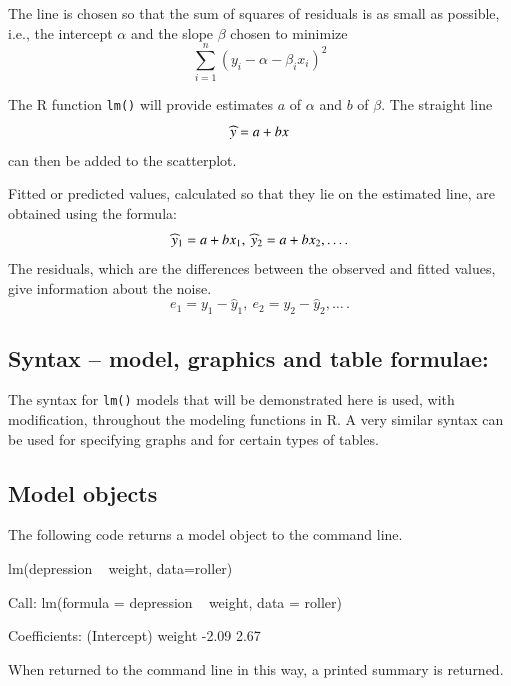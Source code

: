 The line is chosen so that the sum of squares of residuals is as small
as possible, i.e., the intercept
$\alpha$ and the slope $\beta$ chosen to minimize
\[ \sum_{i=1}^n (y_i - \alpha - \beta_i x_i)^2 \]

The R function \verb!lm()! will provide estimates $a$ of
$\alpha$ and $b$ of $\beta$. The straight line \vspace*{-2pt}
\[ \widehat{y} = a + b x
\vspace*{-2pt}
\]
can then be added to the scatterplot.

Fitted or predicted values, calculated so that they lie on the
estimated line, are obtained using the formula: \vspace*{-2pt}
\[ \widehat{y}_1 = a + bx_1, \ \widehat{y}_2 = a + bx_2,\ldots{.}
\vspace*{-2pt}
\]
The residuals, which are the differences between the
observed and fitted values, give information about the noise.
\vspace*{-2pt}
\begin{equation}
e_1 = y_1 - \widehat{y}_1, \ e_2 = y_2 - \widehat{y}_2,\ldots{\,.}
\label{e_i}
\end{equation}

\subsection{Syntax -- model, graphics and table formulae:}
The syntax for \texttt{lm()} models that will be demonstrated here is
used, with modification, throughout the modeling functions in R.  A
very similar syntax can be used for specifying graphs and for certain
types of tables.


\subsection*{Model objects}


The following code returns a model object to the command line.
\begin{Schunk}
\begin{Sinput}
lm(depression ~ weight, data=roller)
\end{Sinput}
\begin{Soutput}

Call:
lm(formula = depression ~ weight, data = roller)

Coefficients:
(Intercept)       weight  
      -2.09         2.67  
\end{Soutput}
\end{Schunk}
\noindent
When returned to the command line in this way,
a printed summary is returned.  


